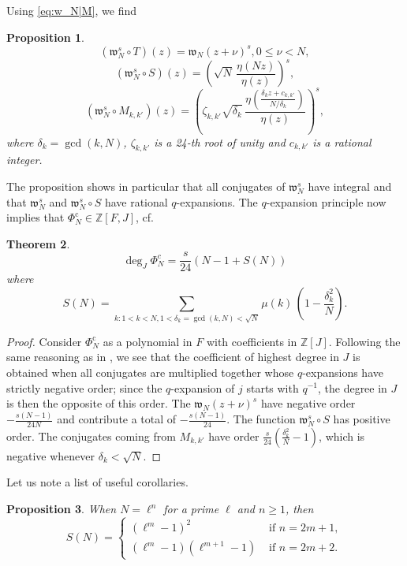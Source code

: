 \documentclass[12pt,twoside,leqno]{article}
\newtheorem{theorem}{Theorem}[section]
\newtheorem{proposition}[theorem]{Proposition}
\numberwithin{equation}{section}
\renewcommand{\geq}{\geqslant}
\renewcommand{\leq}{\leqslant}
\newcommand{\w}{\mathfrak w}
\newcommand{\Z}{\mathbb Z}
\newcommand {\PhiNc}{\Phi_N^{\mathrm c}}
\begin{document}
Using \eqref {eq:w_N|M}, we find
\begin{proposition}
$$(\w_N^s \circ T) (z) = \w_N(z+\nu)^s, 0 \leq \nu < N,$$
$$(\w_N^s \circ S) (z) = \left( \sqrt{N} \, \frac {\eta(N z)}{\eta(z)} \right)^s,$$
$$(\w_N^s \circ M_{k, k'}) (z) = \left( \zeta_{k, k'} \sqrt {\delta_k} \,
\frac{\eta\left( \frac {\delta_k z +
c_{k, k'}}{N/\delta_k} \right) }{\eta(z)}\right)^s,$$
where $\delta_k = \gcd(k, N)$, $\zeta_{k, k'}$ is a 24-th root
of unity and $c_{k, k'}$ is a rational integer.
\end{proposition}

The proposition shows in particular that all conjugates of $\w_N^s$ have integral
and that $\w_N^s$ and $\w_N^s \circ S$ have rational $q$-expansions.
The $q$-expansion principle now implies that $\PhiNc \in \Z [F, J]$,
cf.~\cite [\S 3]{Deuring58}

\begin{theorem}
$$\deg_J \Phi_N^c = \frac{s}{24} (N-1 + S(N))$$
where
\begin {equation}
\label {eq:S}
S(N) = \sum_{k : 1 < k < N, 1 < \delta_k=\gcd(k, N) < \sqrt{N}}
\mu(k) \, \left( 1 - \frac {\delta_k^2}{N} \right).
\end {equation}
\end{theorem}

\begin{proof}
Consider $\PhiNc$ as a polynomial in $F$ with coefficients in $\Z [J]$.
Following the same reasoning as in \cite{EnSc05}, we see that the
coefficient of highest degree in $J$ is obtained when all conjugates are
multiplied together whose $q$-expansions have strictly negative order;
since the $q$-expansion of $j$ starts with $q^{-1}$, the degree in $J$ is
then the opposite of this order.
The $\w_N(z+\nu)^s$ have negative order $- \frac {s (N-1) }{24 N}$
and contribute a total of $- \frac {s (N-1)}{24}$.
The function $\w_N^s \circ S$ has positive order.
The conjugates coming from $M_{k, k'}$ have order
$\frac {s}{24} \left( \frac {\delta_k^2}{N} - 1 \right)$, which is
negative whenever $\delta_k < \sqrt N$.
\end{proof}

Let us note a list of useful corollaries.
\begin{proposition}
When $N = \ell^n$ for a prime $\ell$ and $n \geq 1$, then
$$S(N)= \left\{\begin{array}{ll}
(\ell^m-1)^2 & \text{ if } n = 2m+1,\\
(\ell^m-1)(\ell^{m+1}-1) & \text{ if } n = 2m+2.
\end{array}\right.$$
\end{proposition}
\end{document}
